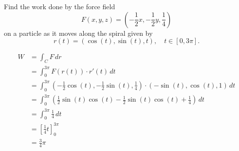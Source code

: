 \begin{exercise}
	Find the work done by the force field
	$$
		F(x,y,z) = \left(-\frac{1}{2}x, -\frac{1}{2}y, \frac{1}{4}\right)
	$$
	on a particle as it moves along the spiral given by
	$$
		r(t) = (\cos(t), \sin(t), t), \quad t \in [0, 3\pi].
	$$
\end{exercise}

\begin{solution}
	$$
		\begin{aligned}
			W & = \int_C F \, dr                                                                                                               \\
			  & = \int_0^{3\pi} F(r(t)) \cdot r'(t) \, dt                                                                                      \\
			  & = \int_0^{3\pi} \left( -\tfrac{1}{2} \cos(t), -\tfrac{1}{2} \sin(t), \tfrac{1}{4} \right) \cdot ( -\sin(t), \cos(t), 1 ) \, dt \\
			  & = \int_0^{3\pi} \left( \tfrac{1}{2} \sin(t) \cos(t) - \tfrac{1}{2} \sin(t) \cos(t) + \tfrac{1}{4} \right) \, dt                \\
			  & = \int_0^{3\pi} \tfrac{1}{4} \, dt                                                                                             \\
			  & = \left[ \tfrac{1}{4} t \right]_0^{3\pi}                                                                                       \\
			  & = \frac{3}{4} \pi
		\end{aligned}
	$$
\end{solution}

